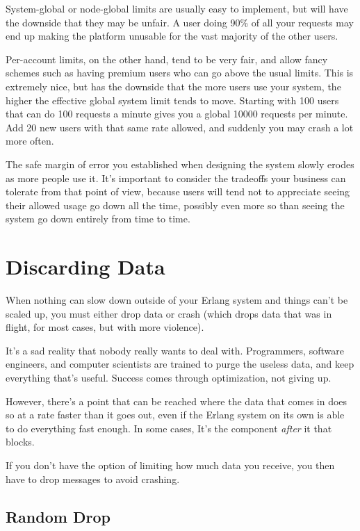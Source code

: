 System-global or node-global limits are usually easy to implement, but will have the downside that they may be unfair. A user doing 90\% of all your requests may end up making the platform unusable for the vast majority of the other users.

Per-account limits, on the other hand, tend to be very fair, and allow fancy schemes such as having premium users who can go above the usual limits. This is extremely nice, but has the downside that the more users use your system, the higher the effective global system limit tends to move. Starting with 100 users that can do 100 requests a minute gives you a global 10000 requests per minute. Add 20 new users with that same rate allowed, and suddenly you may crash a lot more often.

The safe margin of error you established when designing the system slowly erodes as more people use it. It's important to consider the tradeoffs your business can tolerate from that point of view, because users will tend not to appreciate seeing their allowed usage go down all the time, possibly even more so than seeing the system go down entirely from time to time.


\section{Discarding Data}

When nothing can slow down outside of your Erlang system and things can't be scaled up, you must either drop data or crash (which drops data that was in flight, for most cases, but with more violence).

It's a sad reality that nobody really wants to deal with. Programmers, software engineers, and computer scientists are trained to purge the useless data, and keep everything that's useful. Success comes through optimization, not giving up.

However, there's a point that can be reached where the data that comes in does so at a rate faster than it goes out, even if the Erlang system on its own is able to do everything fast enough. In some cases, It's the component \emph{after} it that blocks.

If you don't have the option of limiting how much data you receive, you then have to drop messages to avoid crashing.

\subsection{Random Drop}

